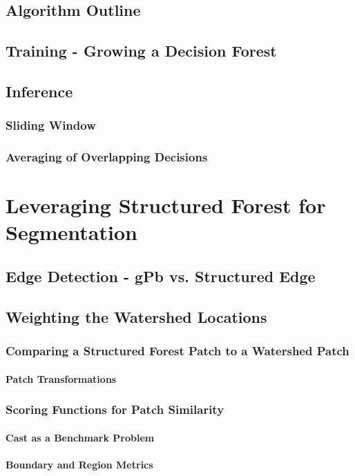 \section{Algorithm Outline}
\section{Training - Growing a Decision Forest}
\section{Inference}
\subsection{Sliding Window}
\subsection{Averaging of Overlapping Decisions}

\chapter{Leveraging Structured Forest for Segmentation}
\label{Chapter4}
\section{Edge Detection - gPb vs. Structured Edge}
\section{Weighting the Watershed Locations}
\subsection{Comparing a Structured Forest Patch to a Watershed Patch}
\subsubsection{Patch Transformations}
\subsection{Scoring Functions for Patch Similarity}
\subsubsection{Cast as a Benchmark Problem}
\subsubsection{Boundary and Region Metrics}

